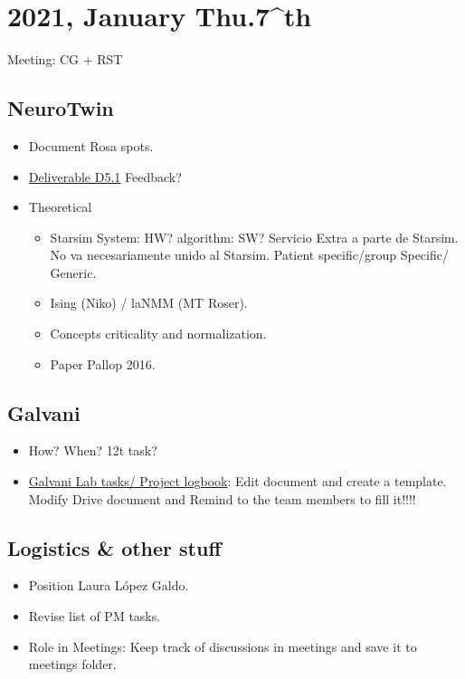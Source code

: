 \section{2021, January Thu.7^{th}}

Meeting: CG + RST

\subsection{NeuroTwin}
\begin{itemize}
    \item Document Rosa spots.
    \item \href{https://www.dropbox.com/home/998%20-%20neurotwin.eu%20repository/05%20-%20Deliverables?preview=NEUROTWIN+Deliverable+-+D5.1+Quality+Guide_v1.6.docx}{Deliverable D5.1} Feedback?

    \item Theoretical
        \begin{itemize}
            \item Starsim System: HW?
         	\itemStimweaver algorithm: SW? Servicio Extra a parte de Starsim. No va necesariamente unido al Starsim. Patient specific/group Specific/ Generic.
            \item	Ising (Niko) / laNMM  (MT Roser).
            \item	Concepts criticality and normalization.
            \item	Paper Pallop 2016.
        \end{itemize}
\end{itemize}


\subsection{Galvani}
\begin{itemize}
    \item How? When? 12t task?
    \item \href{https://docs.google.com/document/d/1pW-zTeiSJdutUG7ir9rBoyD5eRubBpaRs16GNvNYou4/edit?ts=5ff6cca4   }{Galvani Lab tasks/ Project logbook}: Edit document and create a template. Modify Drive document and Remind to the team members to fill it!!!! 

\end{itemize}

\subsection{Logistics \& other stuff}
\begin{itemize}
    \item Position Laura López Galdo.
    \item Revise list of PM tasks.
    \item Role in Meetings: Keep track of discussions in meetings and save it to meetings folder.

\end{itemize}

